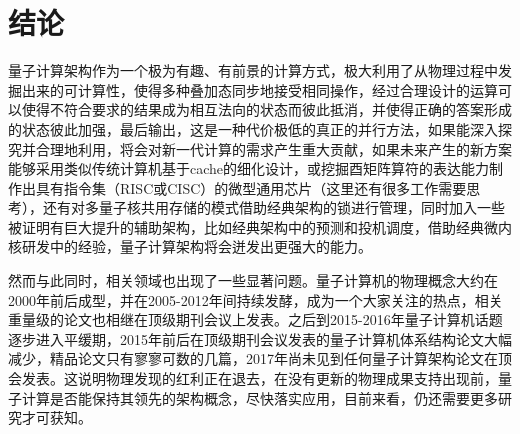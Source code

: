 \documentclass[UTF8, 11pt, a4paper]{ctexart}
\begin{document}
\newpage
\section{结论}
量子计算架构作为一个极为有趣、有前景的计算方式，极大利用了从物理过程中发掘出来的可计算性，使得多种叠加态同步地接受相同操作，经过合理设计的运算可以使得不符合要求的结果成为相互法向的状态而彼此抵消，并使得正确的答案形成的状态彼此加强，最后输出，这是一种代价极低的真正的并行方法，如果能深入探究并合理地利用，将会对新一代计算的需求产生重大贡献，如果未来产生的新方案能够采用类似传统计算机基于cache的细化设计\cite{cache}，或挖掘酉矩阵算符的表达能力制作出具有指令集（RISC或CISC）的微型通用芯片（这里还有很多工作需要思考\cite{risccisc}），还有对多量子核共用存储的模式借助经典架构的锁\cite{lock}进行管理，同时加入一些被证明有巨大提升的辅助架构，比如经典架构中的预测和投机调度\cite{schedule}，借助经典微内核研发中的经验\cite{microkernel20years}，量子计算架构将会迸发出更强大的能力。

然而与此同时，相关领域也出现了一些显著问题。量子计算机的物理概念大约在2000年前后成型，并在2005-2012年间持续发酵，成为一个大家关注的热点，相关重量级的论文也相继在顶级期刊会议上发表。之后到2015-2016年量子计算机话题逐步进入平缓期，2015年前后在顶级期刊会议发表的量子计算机体系结构论文大幅减少，精品论文只有寥寥可数的几篇，2017年尚未见到任何量子计算架构论文在顶会发表。这说明物理发现的红利正在退去，在没有更新的物理成果支持出现前，量子计算是否能保持其领先的架构概念，尽快落实应用，目前来看，仍还需要更多研究才可获知。


\newpage


\end{document}

